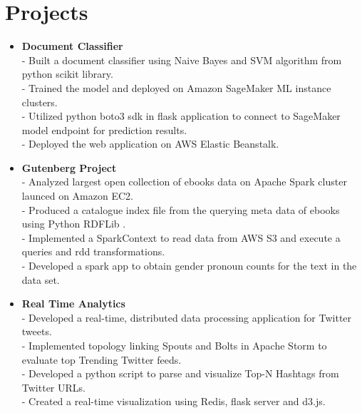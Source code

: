 \section {Projects}
\begin{itemize}



\item \textbf{Document Classifier} \\
 - Built a document classifier using Naive Bayes and SVM algorithm from python scikit library.\\
 - Trained the model and deployed on Amazon SageMaker ML instance clusters.\\
 - Utilized python boto3 sdk in flask application to connect to SageMaker model endpoint for prediction results.\\
 - Deployed the web application on AWS Elastic Beanstalk.

 \item \textbf{Gutenberg Project}\\
 - Analyzed largest open collection of ebooks data on Apache Spark cluster launced on Amazon EC2.\\
 - Produced a catalogue index file from the querying meta data of ebooks using Python RDFLib .\\
 - Implemented a SparkContext to read data from AWS S3 and execute a queries and rdd transformations.\\
 - Developed a spark app to obtain gender pronoun counts for the text in the data set.

\item \textbf{Real Time Analytics} \\
 - Developed a real-time, distributed data processing application for Twitter tweets.\\
 - Implemented topology linking Spouts and Bolts in Apache Storm to evaluate top Trending Twitter feeds. \\
 - Developed a python script to parse and visualize Top-N Hashtags from Twitter URLs.\\
 - Created a real-time visualization using Redis, flask server and d3.js.
 


\end{itemize}
